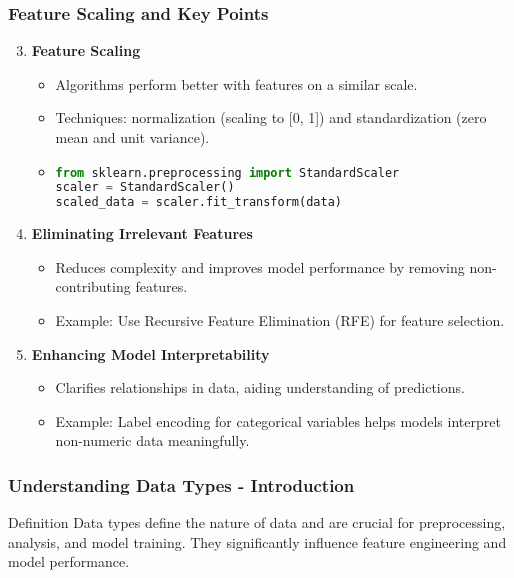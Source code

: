 \documentclass[aspectratio=169]{beamer}
\begin{document}
\begin{frame}[fragile]
    \frametitle{Feature Scaling and Key Points}
    \begin{enumerate}
        \setcounter{enumi}{2} %
        \item \textbf{Feature Scaling}
        \begin{itemize}
            \item Algorithms perform better with features on a similar scale.
            \item Techniques: normalization (scaling to [0, 1]) and standardization (zero mean and unit variance).
            \item \begin{lstlisting}[language=Python, basicstyle=\footnotesize]
from sklearn.preprocessing import StandardScaler
scaler = StandardScaler()
scaled_data = scaler.fit_transform(data)
            \end{lstlisting}
        \end{itemize}

        \item \textbf{Eliminating Irrelevant Features}
        \begin{itemize}
            \item Reduces complexity and improves model performance by removing non-contributing features.
            \item Example: Use Recursive Feature Elimination (RFE) for feature selection.
        \end{itemize}

        \item \textbf{Enhancing Model Interpretability}
        \begin{itemize}
            \item Clarifies relationships in data, aiding understanding of predictions.
            \item Example: Label encoding for categorical variables helps models interpret non-numeric data meaningfully.
        \end{itemize}
    \end{enumerate}
\end{frame}

\begin{frame}[fragile]
    \frametitle{Understanding Data Types - Introduction}
    \begin{block}{Definition}
        Data types define the nature of data and are crucial for preprocessing, analysis, and model training. They significantly influence feature engineering and model performance.
    \end{block}
\end{frame}
\end{document}
